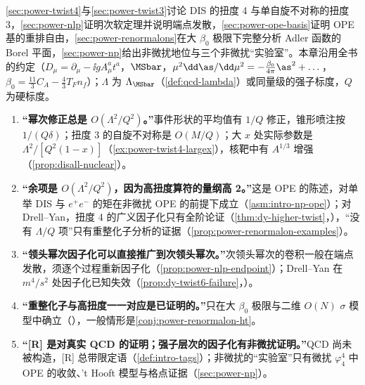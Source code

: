 \cref{sec:power-twist4}与\cref{sec:power-twist3}讨论 DIS 的扭度 4 与单自旋不对称的扭度 3，\cref{sec:power-nlp}证明次软定理并说明端点发散，\cref{sec:power-ope-basis}证明 OPE 基的重排自由，\cref{sec:power-renormalons}在大 $\beta_0$ 极限下完整分析 Adler 函数的 Borel 平面，\cref{sec:power-np}给出非微扰地位与三个非微扰“实验室”。本章沿用全书的约定（$D_\mu=\partial_\mu-\ii gA^a_\mu t^a$，$\MSbar$，$\mu^2\dd\as/\dd\mu^2=-\frac{\beta_0}{4\pi}\as^2+\dots$，$\beta_0=\frac{11}{3}C_A-\frac43T_Fn_f$）；$\Lambda$ 为 $\Lambda_{\MSbar}$（\cref{def:qcd-lambda}）或同量级的强子标度，$Q$ 为硬标度。

\begin{tcolorbox}[enhanced,breakable,title=常见误解（本章）,fonttitle=\bfseries,
  colback=yellow!3!white,colframe=orange!60!black,boxrule=0.6pt,arc=2pt,
  left=5pt,right=5pt,top=3pt,bottom=3pt,before skip=6pt,after skip=6pt]
\begin{enumerate}[label=(\arabic*),leftmargin=1.6em,itemsep=1pt,topsep=1pt]
\item %
\textbf{“幂次修正总是 $O(\Lambda^2/Q^2)$。”}事件形状的平均值有 $1/Q$ 修正\cite{DokshitzerWebber1995}，锥形喷注按 $1/(Q\delta)$\cite{Korchemsky:1994is}；扭度 3 的自旋不对称是 $O(M/Q)$；大 $x$ 处实际参数是 $\Lambda^2/[Q^2(1-x)]$（\cref{ex:power-twist4-largex}），核靶中有 $A^{1/3}$ 增强（\cref{prop:disall-nuclear}）。
\item %
\textbf{“余项是 $O(\Lambda^2/Q^2)$，因为高扭度算符的量纲高 2。”}这是 OPE 的陈述，对单举 DIS 与 $e^+e^-$ 的矩在非微扰 OPE 的前提下成立（\cref{asm:intro-np-ope}）；对 Drell--Yan，扭度 4 的广义因子化只有全阶论证（\cref{thm:dy-higher-twist}，\tagA），“没有 $\Lambda/Q$ 项”只有重整化子分析的证据（\cref{prop:power-renormalon-examples}）。
\item %
\textbf{“领头幂次因子化可以直接推广到次领头幂次。”}次领头幂次的卷积一般在端点发散，须逐个过程重新因子化（\cref{prop:power-nlp-endpoint}）；Drell--Yan 在 $m^4/s^2$ 处因子化已知失效（\cref{prop:dy-twist6-failure}，\tagV）。
\item %
\textbf{“重整化子与高扭度一一对应是已证明的。”}只在大 $\beta_0$ 极限与二维 $O(N)$ $\sigma$ 模型中确立（\tagP），一般情形是\cref{conj:power-renormalon-ht}。
\item %
\textbf{“[R] 是对真实 QCD 的证明；强子层次的因子化有非微扰证明。”}QCD 尚未被构造，[R] 总带限定语（\cref{def:intro-tags}）；非微扰的“实验室”只有微扰 $\varphi^4_4$ 中 OPE 的收敛、't Hooft 模型与格点证据（\cref{sec:power-np}）。
\end{enumerate}
\end{tcolorbox}

